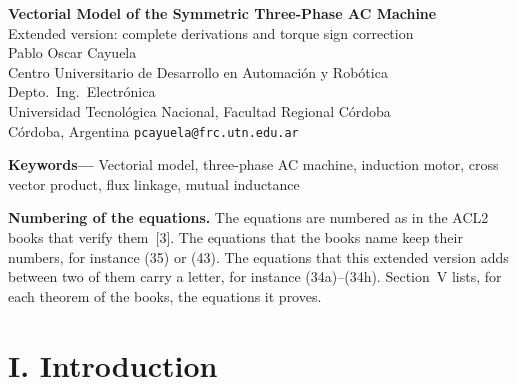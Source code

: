 \documentclass[11pt,a4paper]{article}
\begin{document}
\begin{center}
{\LARGE\bfseries Vectorial Model of the Symmetric Three-Phase AC Machine}\\[0.4em]
{\large Extended version: complete derivations and torque sign correction}\\[1em]
Pablo Oscar Cayuela\\
Centro Universitario de Desarrollo en Automaci\'on y Rob\'otica\\
Depto.\ Ing.\ Electr\'onica\\
Universidad Tecnol\'ogica Nacional, Facultad Regional C\'ordoba\\
C\'ordoba, Argentina \quad\texttt{pcayuela@frc.utn.edu.ar}
\end{center}

\begin{abstract}
\noindent We present the development of a model using vectorial notation, derived from the equivalence between complex numbers, phasors, and vectors, with heavy subindexing to express in few equations all the variants considered from their original complex-domain form in the reference textbook. This extended version completes three derivations that the original paper stated without development: obtaining the self and mutual inductances from the joint magnetic induction, the algebraic collapse of the three-phase sum in the definition of the flux-linkage space vector, and the full derivation of the torque equation from its original complex form to the final cross-product expression. This last derivation allowed detecting and correcting a sign error in the exponent of the torque equation as it appeared in the original text.
\end{abstract}

\noindent\textbf{Keywords---} Vectorial model, three-phase AC machine, induction motor, cross vector product, flux linkage, mutual inductance

\medskip
\noindent\textbf{Numbering of the equations.} The equations are numbered as in the ACL2 books that verify them~[3]. The equations that the books name keep their numbers, for instance (35) or (43). The equations that this extended version adds between two of them carry a letter, for instance (34a)--(34h). Section~V lists, for each theorem of the books, the equations it proves.

\section*{I. Introduction}
\end{document}
